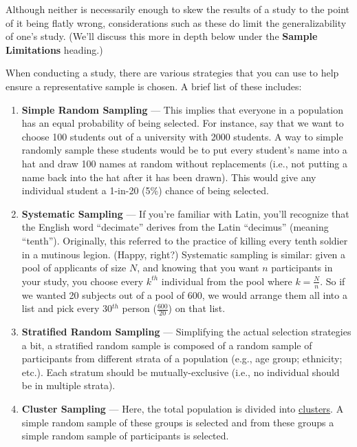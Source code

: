 Although neither is necessarily enough to skew the results of a study to the point of it being flatly wrong, considerations such as these do limit the generalizability of one's study. (We'll discuss this more in depth below under the \textbf{Sample Limitations} heading.)

When conducting a study, there are various strategies that you can use to help ensure a representative sample is chosen. A brief list of these includes:

\begin{enumerate}
  \item \textbf{Simple Random Sampling} --- This implies that everyone in a population has an equal probability of being selected. For instance, say that we want to choose 100 students out of a university with 2000 students. A way to simple randomly sample these students would be to put every student's name into a hat and draw 100 names at random without replacements (i.e., not putting a name back into the hat after it has been drawn). This would give any individual student a 1-in-20 (5\%) chance of being selected.
  \item \textbf{Systematic Sampling} --- If you're familiar with Latin, you'll recognize that the English word ``decimate'' derives from the Latin ``decimus'' (meaning ``tenth''). Originally, this referred to the practice of killing every tenth soldier in a mutinous legion. (Happy, right?) Systematic sampling is similar: given a pool of applicants of size \( N \), and knowing that you want \( n \) participants in your study, you choose every \(k^{th} \) individual from the pool where \(k=\frac{N}{n}\). So if we wanted 20 subjects out of a pool of 600, we would arrange them all into a list and pick every 30$^{th}$ person (\(\frac{600}{20}\)) on that list.
  \item \textbf{Stratified Random Sampling} --- Simplifying the actual selection strategies a bit, a stratified random sample is composed of a random sample of participants from different strata of a population (e.g., age group; ethnicity; etc.). Each stratum should be mutually-exclusive (i.e., no individual should be in multiple strata).
  \item \textbf{Cluster Sampling} --- Here, the total population is divided into \href{http://en.wikipedia.org/wiki/Data_clustering}{clusters}. A simple random sample of these groups is selected and from these groups a simple random sample of participants is selected.
\end{enumerate}

